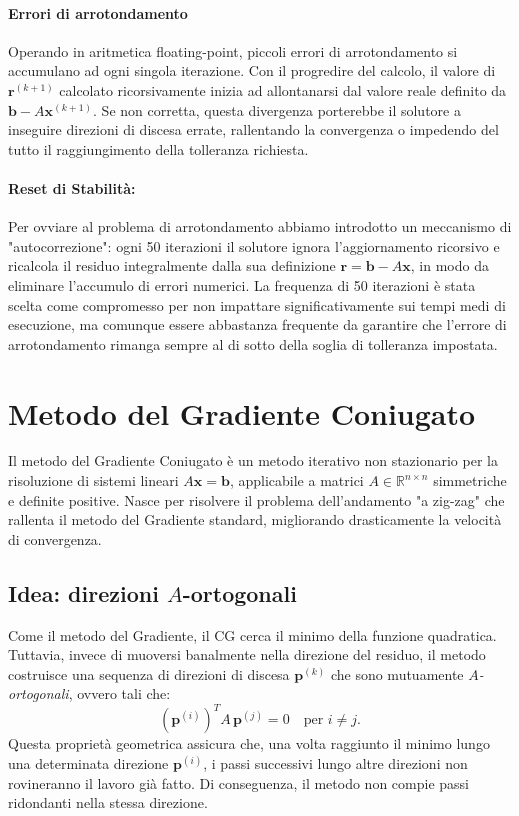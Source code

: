 \documentclass[a4paper, 12pt]{report}
\begin{document}
\paragraph{Errori di arrotondamento}
Operando in aritmetica floating-point, piccoli errori di
arrotondamento si accumulano ad ogni singola iterazione. Con il progredire del
calcolo, il valore di $\mathbf{r}^{(k+1)}$ calcolato ricorsivamente inizia ad allontanarsi dal valore reale definito da $\mathbf{b} - A\mathbf{x}^{(k+1)}$.
Se non corretta, questa divergenza porterebbe il solutore a inseguire direzioni di
discesa errate, rallentando la convergenza o impedendo del tutto il raggiungimento
della tolleranza richiesta.

\paragraph{Reset di Stabilità:}
Per ovviare al problema di arrotondamento abbiamo introdotto un meccanismo di "autocorrezione":
ogni 50 iterazioni il solutore ignora l'aggiornamento ricorsivo e ricalcola il
residuo integralmente dalla sua definizione $\mathbf{r} = \mathbf{b} - A\mathbf{x}$, in modo da eliminare l'accumulo di errori numerici. La frequenza di 50 iterazioni è stata scelta come
compromesso per non impattare significativamente sui
tempi medi di esecuzione, ma comunque essere abbastanza frequente da garantire che l'errore di arrotondamento
rimanga sempre al di sotto della soglia di tolleranza impostata.
\section{Metodo del Gradiente Coniugato}

Il metodo del Gradiente Coniugato è un metodo 
iterativo non stazionario per la risoluzione di sistemi lineari $A\mathbf{x} = \mathbf{b}$,
applicabile a matrici $A \in \mathbb{R}^{n \times n}$ simmetriche e definite
positive. Nasce per risolvere il problema dell'andamento "a zig-zag" che 
rallenta il metodo del Gradiente standard, migliorando drasticamente la velocità 
di convergenza.

\subsection*{Idea: direzioni $A$-ortogonali}

Come il metodo del Gradiente, il CG cerca il minimo della funzione quadratica.
Tuttavia, invece di muoversi banalmente nella direzione del residuo,
il metodo costruisce una sequenza di direzioni di discesa $\mathbf{p}^{(k)}$ 
che sono mutuamente \emph{$A$-ortogonali}, ovvero tali che:
\[
    \left(\mathbf{p}^{(i)}\right)^T A\,\mathbf{p}^{(j)} = 0 \quad \text{per } i \neq j.
\]
Questa proprietà geometrica assicura che, una volta raggiunto il minimo lungo 
una determinata direzione $\mathbf{p}^{(i)}$, i passi successivi lungo altre 
direzioni non rovineranno il lavoro già fatto. Di conseguenza, il metodo 
non compie passi ridondanti nella stessa direzione.
\end{document}
